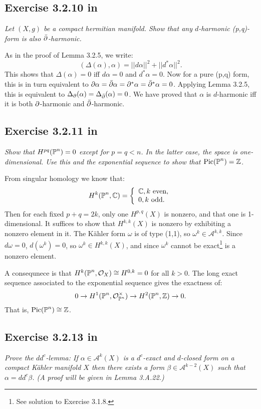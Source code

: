 \documentclass{article}
\begin{document}
\subsection*{Exercise 3.2.10 in \cite{Huy}}
\emph{Let $(X, g)$ be a compact hermitian manifold. Show that any $d$-harmonic
(p,q)-form is also $\bar {\partial}$-harmonic.}
\vspace{3mm}

As in the proof of Lemma 3.2.5, we write:
\[	(\Delta(\alpha), \alpha) = ||d\alpha||^2 + ||d^*\alpha||^2.	\]
This shows that $\Delta(\alpha) = 0$ iff $d\alpha = 0$ and $d^*\alpha = 0$. Now for a pure (p,q) form, this is
in turn equivalent to $\partial \alpha = \bar {\partial} \alpha = \partial^* \alpha = \bar {\partial}^* \alpha = 0$. Applying Lemma 3.2.5,
this is equivalent to $\Delta_{\partial}(\alpha) = \Delta_{\bar {\partial}}(\alpha) = 0$. We have proved that $\alpha$ is $d$-harmonic
iff it is both $\partial$-harmonic and $\bar {\partial}$-harmonic.



\subsection*{Exercise 3.2.11 in \cite{Huy}}
\emph{Show that $H^{pq}(\operatorname{\mathbb{P}}^n) = 0$ except for $p = q < n$. In the latter case, the space
is one-dimensional. Use this and the exponential sequence to show that $\operatorname{Pic}(\operatorname{\mathbb{P}}^n) = \mathbb{Z}$.}
\vspace{3mm}
 
From singular homology we know that:
\[	H^k(\operatorname{\mathbb{P}}^n,\mathbb{C}) = \left\{ \begin{array}{l} \mathbb{C}, k \text{ even}, \\ 0, k \text{ odd}. \end{array}\right. 	\]
Then for each fixed $p+q=2k$, only one $H^{p,q}(X)$ is nonzero, and that one is 1-dimensional. It suffices to 
show that $H^{k,k}(X)$ is nonzero by exhibiting a nonzero element in it. The K\"{a}hler form $\omega$ is
of type (1,1), so $\omega^k \in \mathcal{A}^{k,k}$. Since $d\omega = 0$, $d(\omega^k) = 0$, so $\omega^k
\in H^{k,k}(X)$, and since $\omega^k$ cannot be exact\footnote{See solution to Exercise 3.1.8.} is a nonzero element.

A consequnece is that $H^k(\operatorname{\mathbb{P}}^n,\mathcal{O}_X) \cong H^{0,k} = 0$ for all $k>0$. The long exact sequence associated to
the exponential sequence gives the exactness of:
\[	0 \to H^1(\operatorname{\mathbb{P}}^n,\mathcal{O}_{\operatorname{\mathbb{P}}^n}^{\times}) \to H^2(\operatorname{\mathbb{P}}^n,\mathbb{Z}) \to 0.	\]
That is, $\operatorname{Pic}(\operatorname{\mathbb{P}}^n) \cong \mathbb{Z}$.



\subsection*{Exercise 3.2.13 in \cite{Huy}}
\emph{Prove the $dd^c$-lemma: If $\alpha \in\mathcal{A}^k(X)$ is a $d^c$-exact and $d$-closed form
on a compact K\"{a}hler manifold $X$ then there exists a form $\beta \in\mathcal{A}^{k-2}(X)$ such that
$\alpha = dd^c \beta$. (A proof will be given in Lemma 3.A.22.)}
\vspace{3mm}
\end{document}

